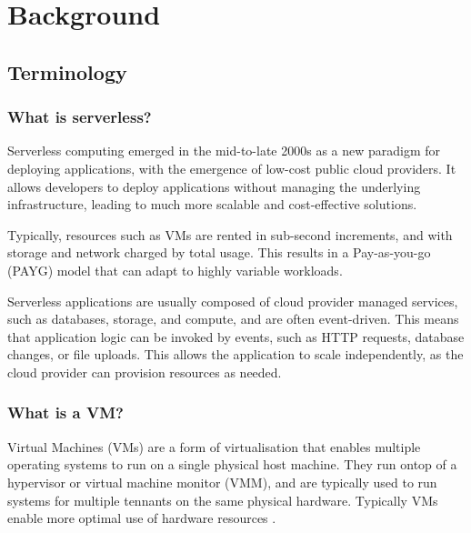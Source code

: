 \chapter{Background}

\section{Terminology}
\subsection{What is serverless?}
Serverless computing emerged in the mid-to-late 2000s\cite{wardleyWardleyMaps2022,IntroducingGoogleApp,patilServerlessComputingEmergence2021} as a new paradigm for deploying applications, with the emergence of low-cost public cloud providers\cite{patilServerlessComputingEmergence2021,BenjaminBlackEC2}. It allows developers to deploy applications without managing the underlying infrastructure, leading to much more scalable and cost-effective solutions.

Typically, resources such as VMs\cite{hoeferTaxonomyCloudComputing2010} are rented in sub-second increments, and with storage and network charged by total usage. This results in a Pay-as-you-go (PAYG) model that can adapt to highly variable workloads\cite{sehgalCostBillingPractices2023,hilleyCloudComputingTaxonomy2009}.

Serverless applications are usually composed of cloud provider managed services, such as databases, storage, and compute, and are often event-driven\cite{EventarcOverview,EventListenerAmazon,robeceOverviewAzureEvent2024}. This means that application logic can be invoked by events, such as HTTP requests, database changes, or file uploads. This allows the application to scale independently\cite{goniwadaCloudNativeArchitecture2022}, as the cloud provider can provision resources as needed.

\subsection{What is a VM?}
Virtual Machines (VMs) are a form of virtualisation that enables multiple operating systems to run on a single physical host machine\cite{ramosjoaocarloscarvalhodossantosSecurityChallengesVirtualization2009}. They run ontop of a hypervisor or virtual machine monitor (VMM), and are typically used to run systems for multiple tennants on the same physical hardware. Typically VMs enable more optimal use of hardware resources \cite{desaiHypervisorSurveyConcepts2013}.

